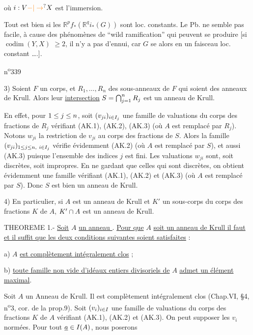 où $i:V\unsure{-|\to}X$ est l'immersion.

Tout est bien si les $\mathbb R^p f_*(\mathbb R^q i_*(G))$
sont loc. constants. Le Pb. ne
semble pas facile,  à cause des
phénomènes de ``wild ramification''
qui peuvent se produire [si $\operatorname{codim}(Y,X)$
$\geq 2$, il n'y a pas d'ennui, car $G$
se  alors en un faisceau
loc. constant \ldots\thinspace.]. 



n\textsuperscript{o}339

3) Soient $F$ un corps, et $R_1,\ldots,R_n$ des sous-anneaux de $F$ qui soient des anneaux de Krull. Alors leur \uline{intersection} $S=\bigcap_{j=1}^{n}R_j$ est un anneau de Krull.

En effet, pour $1\leq j\leq n$, soit $(v_{ji})_{i\in I_j}$ une famille de valuations du corps des fractions de $R_j$ vérifiant (AK.1), (AK.2), (AK.3) (où $A$ est remplacé par $R_j$). Notons $w_{ji}$ la restriction de $v_{ji}$ au corps des fractions de $S$. Alors la famille $(v_{ji})_{1\handwritten{\leq}j\handwritten{\leq}n,\ i\handwritten{\in}I_j}$ vérifie évidemment (AK.2) (où $A$ est remplacé par $S$), et aussi (AK.3) puisque l'ensemble des indices $j$ est fini. Les valuations $w_{ji}$ sont, soit discrètes, soit impropres. En ne gardant que celles qui sont discrètes, on obtient évidemment une famille vérifiant (AK.1), (AK.2) et (AK.3) (où $A$ est remplacé par $S$). Donc $S$ est bien un anneau de Krull.

4) En particulier, si $A$ est un anneau de Krull et $K'$ un sous-corps du corps des fractions $K$ de $A$, $K'\cap A$ est un anneau de Krull.

THEOREME 1.- \uline{Soit} $A$ \uline{un anneau }. \uline{Pour que} $A$ \uline{soit un anneau de Krull il faut et il suffit que les deux conditions suivantes soient satisfaites} :

a) $A$ \uline{est complètement intégralement clos} ;

b) \uline{toute famille non vide d'idéaux entiers divisoriels de} $A$ \uline{admet un élément maximal}.

Soit $A$ un Anneau de Krull. Il est complètement intégralement clos (Chap.VI, \S4, n\textsuperscript{o}3, cor. de la prop.9). Soit $(v_i)_{i\in I}$ une famille de valuations du corps des fractions $K$ de $A$ vérifiant (AK.1), (AK.2) et (AK.3). On peut supposer les $v_i$ normées. Pour tout $\underline a\in I(A)$, nous poserons

